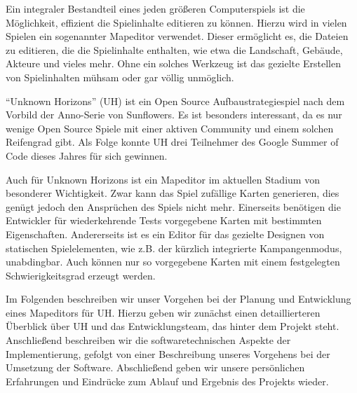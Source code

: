 Ein integraler Bestandteil eines jeden größeren Computerspiels ist die
Möglichkeit, effizient die Spielinhalte editieren zu können. Hierzu wird in vielen Spielen ein sogenannter Mapeditor verwendet.
Dieser ermöglicht es, die Dateien zu editieren, die die Spielinhalte enthalten, wie etwa
die Landschaft, Gebäude, Akteure und vieles mehr.
Ohne ein solches Werkzeug ist das gezielte Erstellen von Spielinhalten mühsam
oder gar völlig unmöglich.

\enquote{Unknown Horizons} (UH) ist ein Open Source
Aufbaustrategiespiel nach dem Vorbild der Anno-Serie von Sunflowers.
Es ist
besonders interessant, da es nur wenige Open Source Spiele mit einer aktiven
Community und einem solchen Reifengrad gibt. Als Folge konnte UH drei Teilnehmer des
Google Summer of Code dieses Jahres für sich gewinnen.

Auch für Unknown Horizons ist ein Mapeditor im aktuellen Stadium von besonderer
Wichtigkeit.
Zwar kann das Spiel zufällige Karten generieren, dies genügt jedoch den
Ansprüchen des Spiels nicht mehr. Einerseits benötigen die Entwickler für
wiederkehrende Tests vorgegebene Karten mit bestimmten Eigenschaften.
Andererseits ist es ein Editor für das gezielte Designen von statischen
Spielelementen, wie z.B. der kürzlich integrierte
Kampangenmodus, unabdingbar. Auch können nur so vorgegebene Karten mit einem
festgelegten Schwierigkeitsgrad erzeugt werden.

Im Folgenden beschreiben wir unser Vorgehen bei der Planung und Entwicklung
eines Mapeditors für UH. Hierzu geben wir zunächst einen detaillierteren
Überblick über UH und das Entwicklungsteam, das hinter dem Projekt steht.
Anschließend beschreiben wir die softwaretechnischen Aspekte der Implementierung, gefolgt
von einer Beschreibung unseres Vorgehens bei der Umsetzung der Software. Abschließend
geben wir unsere persönlichen Erfahrungen und Eindrücke zum Ablauf und Ergebnis des Projekts
wieder.

